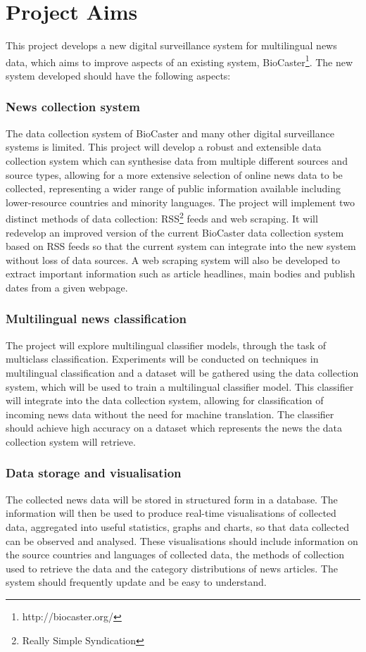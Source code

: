 \documentclass{l4proj}
\begin{document}
\section{Project Aims}
This project develops a new digital surveillance system for multilingual news data, which aims to improve aspects of an existing system, BioCaster\footnote{http://biocaster.org/}. The new system developed should have the following aspects: 

\subsubsection{News collection system}
The data collection system of BioCaster and many other digital surveillance systems is limited. This project will develop a robust and extensible data collection system which can synthesise data from multiple different sources and source types, allowing for a more extensive selection of online news data to be collected, representing a wider range of public information available including lower-resource countries and minority languages. The project will implement two distinct methods of data collection: RSS\footnote{Really Simple Syndication} feeds and web scraping. It will redevelop an improved version of the current BioCaster data collection system based on RSS feeds so that the current system can integrate into the new system without loss of data sources. A web scraping system will also be developed to extract important information such as article headlines, main bodies and publish dates from a given webpage.
\subsubsection{Multilingual news classification}
The project will explore multilingual classifier models, through the task of multiclass classification. Experiments will be conducted on techniques in multilingual classification and a dataset will be gathered using the data collection system, which will be used to train a multilingual classifier model. This classifier will integrate into the data collection system, allowing for classification of incoming news data without the need for machine translation. The classifier should achieve high accuracy on a dataset which represents the news the data collection system will retrieve.
\subsubsection{Data storage and visualisation} The collected news data will be stored in structured form in a database. The information will then be used to produce real-time visualisations of collected data, aggregated into useful statistics, graphs and charts, so that data collected can be observed and analysed. These visualisations should include information on the source countries and languages of collected data, the methods of collection used to retrieve the data and the category distributions of news articles. The system should frequently update and be easy to understand.
\end{document}
